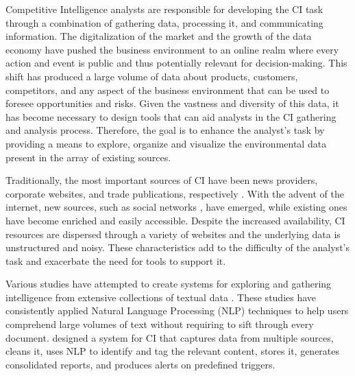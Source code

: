 \documentclass[a4paper]{article}
\begin{document}
Competitive Intelligence analysts are responsible for developing the CI task through a combination of gathering data, processing it, and communicating information. The digitalization of the market and the growth of the data economy have pushed the business environment to an online realm where every action and event is public and thus potentially relevant for decision-making. This shift has produced a large volume of data about products, customers, competitors, and any aspect of the business environment that can be used to foresee opportunities and risks. Given the vastness and diversity of this data, it has become necessary to design tools that can aid analysts in the CI gathering and analysis process. Therefore, the goal is to enhance the analyst's task by providing a means to explore, organize and visualize the environmental data present in the array of existing sources.

Traditionally, the most important sources of CI have been news providers, corporate websites, and trade publications, respectively \citep{marin2004}. With the advent of the internet, new sources, such as social networks \citep{dey2011}, have emerged, while existing ones have become enriched and easily accessible. Despite the increased availability, CI resources are dispersed through a variety of websites and the underlying data is unstructured and noisy. These characteristics add to the difficulty of the analyst's task and exacerbate the need for tools to support it.

Various studies have attempted to create systems for exploring and gathering intelligence from extensive collections of textual data \citep{dey2011, esteva2020, lafia2019, lafia2021a, caillou2021}. These studies have consistently applied Natural Language Processing (NLP) techniques to help users comprehend large volumes of text without requiring to sift through every document. \citet{dey2011} designed a system for CI that captures data from multiple sources, cleans it, uses NLP to identify and tag the relevant content, stores it, generates consolidated reports, and produces alerts on predefined triggers.
\end{document}

